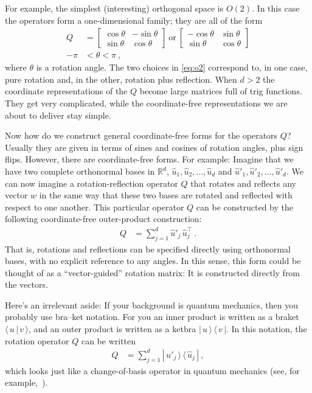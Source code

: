 \documentclass{article}
\newcommand{\braket}[2]{\langle\,{#1}\,|\,{#2}\,\rangle}
\newcommand{\ketbra}[2]{|\,{#1}\,\rangle\,\langle\,{#2}\,|}
\begin{document}
For example, the simplest (interesting) orthogonal space is $O(2)$. In this case the operators form a one-dimensional family; they are all of the form
\begin{align}
    Q &= \begin{bmatrix}\cos{\theta} & -\sin{\theta} \\ \sin{\theta} & \cos{\theta}\end{bmatrix} ~\mbox{or}~
    \begin{bmatrix}-\cos{\theta} & \sin{\theta} \\ \sin{\theta} & \cos{\theta}\end{bmatrix} \label{eq:o2}
    \\
    -\pi &< \theta < \pi ~,
\end{align}
where $\theta$ is a rotation angle.
The two choices in \eqref{eq:o2} correspond to, in one case, pure rotation and, in the other, rotation plus reflection.
When $d>2$ the coordinate representations of the $Q$ become large matrices full of trig functions.
They get very complicated, while the coordinate-free representations we are about to deliver stay simple.

Now how do we construct general coordinate-free forms for the operators $Q$?
Usually they are given in terms of sines and cosines of rotation angles, plus sign flips.
However, there are coordinate-free forms.
For example: Imagine that we have two complete orthonormal bases in $\mathbb{R}^d$, $\hat{u}_1,\hat{u}_2,\ldots,\hat{u}_d$ and $\hat{u}'_1,\hat{u}'_2,\ldots,\hat{u}'_d$.
We can now imagine a rotation-reflection operator $Q$ that rotates and reflects any vector $w$ in the same way that these two bases are rotated and reflected with respect to one another.
This particular operator $Q$ can be constructed by the following coordinate-free outer-product construction:
\begin{align}
    Q &= \sum_{j=1}^d \hat{u}'_j\,\hat{u}_j^\top ~.
\end{align}
That is, rotations and reflections can be specified directly using orthonormal bases, with no explicit reference to any angles.
In this sense, this form could be thought of as a ``vector-guided'' rotation matrix:
It is constructed directly from the vectors.

Here's an irrelevant aside:
If your background is quantum mechanics, then you probably use bra--ket notation.
For you an inner product is written as a braket $\braket{u}{v}$, and an outer product is written as a ketbra $\ketbra{u}{v}$.
In this notation, the rotation operator $Q$ can be written 
\begin{align}
    Q &= \sum_{j=1}^d \ketbra{\hat{u}'_j}{\hat{u}_j} ~,
\end{align}
which looks just like a change-of-basis operator in quantum mechanics (see, for example,~\cite{}).
\end{document}
